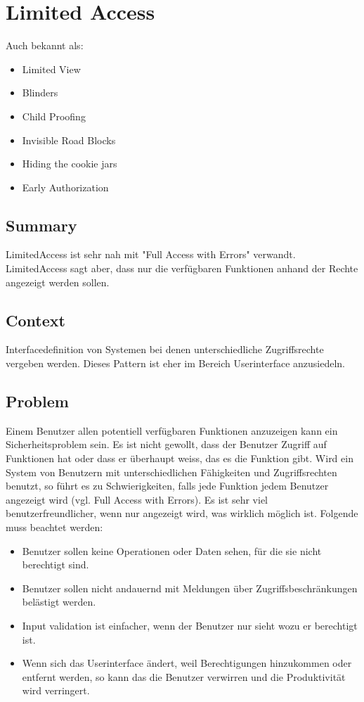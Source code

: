 \chapter{Limited Access}

Auch bekannt als:
\begin{itemize}
  \item Limited View
  \item Blinders
  \item Child Proofing
  \item Invisible Road Blocks
  \item Hiding the cookie jars
  \item Early Authorization
\end{itemize}

\section{Summary}
LimitedAccess ist sehr nah mit "Full Access with Errors" verwandt. LimitedAccess sagt aber, dass nur die verfügbaren Funktionen anhand der Rechte angezeigt werden sollen.

\section{Context}
Interfacedefinition von Systemen bei denen unterschiedliche Zugriffsrechte vergeben werden. Dieses Pattern ist eher im Bereich Userinterface anzusiedeln.

\section{Problem}
Einem Benutzer allen potentiell verfügbaren Funktionen anzuzeigen kann ein Sicherheitsproblem sein. Es ist nicht gewollt, dass der Benutzer Zugriff auf Funktionen hat oder dass er überhaupt weiss, das es die Funktion gibt. Wird ein System von Benutzern mit unterschiedlichen Fähigkeiten und Zugriffsrechten benutzt, so führt es zu Schwierigkeiten, falls jede Funktion jedem Benutzer angezeigt wird (vgl. Full Access with Errors). Es ist sehr viel benutzerfreundlicher, wenn nur angezeigt wird, was wirklich möglich ist. Folgende muss beachtet werden:

\begin{itemize}
  \item Benutzer sollen keine Operationen oder Daten sehen, für die sie nicht berechtigt sind.
  \item Benutzer sollen nicht andauernd mit Meldungen über Zugriffsbeschränkungen belästigt werden.
  \item Input validation ist einfacher, wenn der Benutzer nur sieht wozu er berechtigt ist.
  \item Wenn sich das Userinterface ändert, weil Berechtigungen hinzukommen oder entfernt werden, so kann das die Benutzer verwirren und die Produktivität wird verringert.
\end{itemize}

